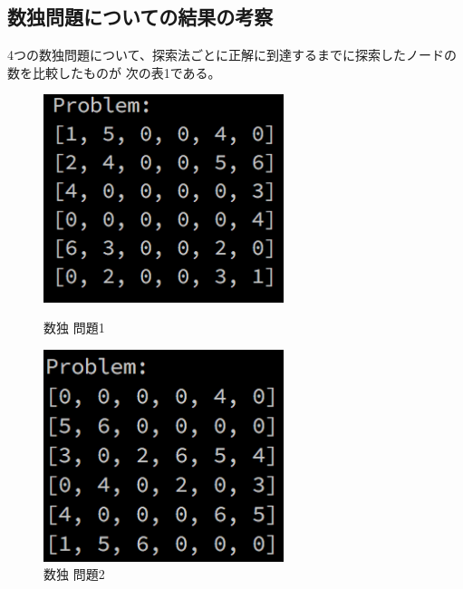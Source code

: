 \documentclass[uplatex]{jsarticle}
\begin{document}
\subsection{数独問題についての結果の考察}
4つの数独問題について、探索法ごとに正解に到達するまでに探索したノードの数を比較したものが
次の表1である。
\begin{figure}[htbp]
 \begin{minipage}{0.5\hsize}
  \begin{center}
   \includegraphics[width=70mm]{img/sudoku_1.png}
  \end{center}
  \caption{数独 問題1}
  \label{fig:one}
 \end{minipage}
 \begin{minipage}{0.5\hsize}
  \begin{center}
   \includegraphics[width=70mm]{img/sudoku_2.png}
  \end{center}
  \caption{数独 問題2}
  \label{fig:two}
 \end{minipage}
\end{figure}
\end{document}
